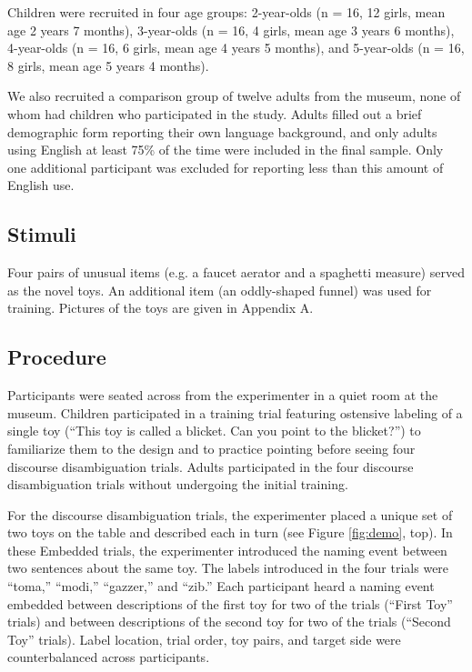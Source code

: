 \documentclass[man]{apa2}
\begin{document}
Children were recruited in four age groups: 2-year-olds (n = 16, 12 girls, mean age 2 years 7 months), 3-year-olds (n = 16, 4 girls, mean age 3 years 6 months), 4-year-olds (n = 16, 6 girls, mean age 4 years 5 months), and 5-year-olds (n = 16, 8 girls, mean age 5 years 4 months).  

We also recruited a comparison group of twelve adults from the museum, none of whom had children who participated in the study. Adults filled out a brief demographic form reporting their own language background, and only adults using English at least 75\% of the time were included in the final sample. Only one additional participant was excluded for reporting less than this amount of English use.  


\subsection{Stimuli}

Four pairs of unusual items (e.g. a faucet aerator and a spaghetti measure) served as the novel toys.  An additional item (an oddly-shaped funnel) was used for training. Pictures of the toys are given in Appendix A.

\subsection{Procedure}

Participants were seated across from the experimenter in a quiet room at the museum.  Children participated in a training trial featuring ostensive labeling of a single toy (``This toy is called a blicket.  Can you point to the blicket?'') to familiarize them to the design and to practice pointing before seeing four discourse disambiguation trials.  Adults participated in the four discourse disambiguation trials without undergoing the initial training. 

For the discourse disambiguation trials, the experimenter placed a unique set of two toys on the table and described each in turn (see Figure \ref{fig:demo}, top).  In these Embedded trials, the experimenter introduced the naming event between two sentences about the same toy.  The labels introduced in the four trials were ``toma,'' ``modi,'' ``gazzer,'' and ``zib.''  Each participant heard a naming event embedded between descriptions of the first toy for two of the trials (``First Toy'' trials) and between descriptions of the second toy for two of the trials (``Second Toy'' trials).  Label location, trial order, toy pairs, and target side were counterbalanced across participants.  
\end{document}
